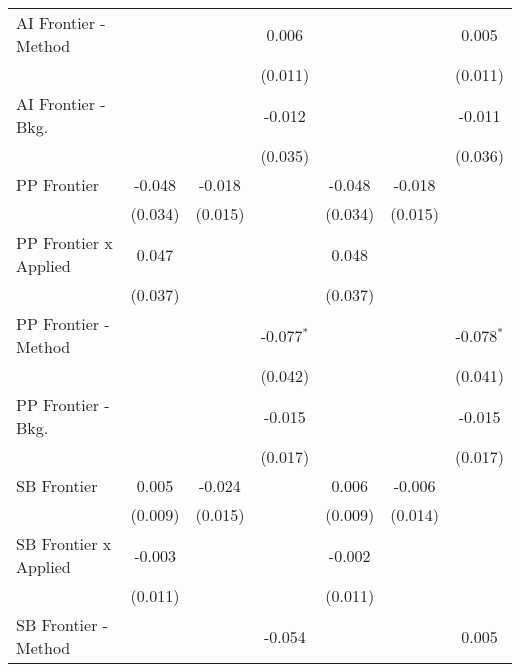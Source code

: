 \begin{tabular}{lcccccc}
   AI Frontier - Method         &                &         & 0.006         &                &         & 0.005\\   
                                &                &         & (0.011)       &                &         & (0.011)\\   
   AI Frontier - Bkg.           &                &         & -0.012        &                &         & -0.011\\   
                                &                &         & (0.035)       &                &         & (0.036)\\   
   PP Frontier                  & -0.048         & -0.018  &               & -0.048         & -0.018  &   \\   
                                & (0.034)        & (0.015) &               & (0.034)        & (0.015) &   \\   
   PP Frontier x Applied        & 0.047          &         &               & 0.048          &         &   \\   
                                & (0.037)        &         &               & (0.037)        &         &   \\   
   PP Frontier - Method         &                &         & -0.077$^{*}$  &                &         & -0.078$^{*}$\\   
                                &                &         & (0.042)       &                &         & (0.041)\\   
   PP Frontier - Bkg.           &                &         & -0.015        &                &         & -0.015\\   
                                &                &         & (0.017)       &                &         & (0.017)\\   
   SB Frontier                  & 0.005          & -0.024  &               & 0.006          & -0.006  &   \\   
                                & (0.009)        & (0.015) &               & (0.009)        & (0.014) &   \\   
   SB Frontier x Applied        & -0.003         &         &               & -0.002         &         &   \\   
                                & (0.011)        &         &               & (0.011)        &         &   \\   
   SB Frontier - Method         &                &         & -0.054        &                &         & 0.005\\   

\end{tabular}
